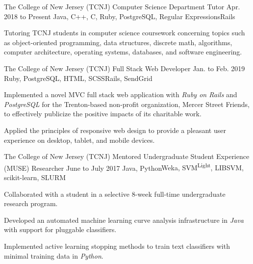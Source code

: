 
\begin{cventry}
    {The College of New Jersey (TCNJ)}
    {Computer Science Department Tutor}
    {Apr. 2018 to Present}
    {Java, C++, C, Ruby, PostgreSQL, Regular Expressions}{Rails}
    \begin{cvitems}
        \item Tutoring TCNJ students in computer science coursework concerning topics such as object-oriented programming, data structures, discrete math, algorithms, computer architecture, operating systems, databases, and software engineering.
    \end{cvitems}
\end{cventry}

\begin{cventry}
    {The College of New Jersey (TCNJ)}
    {Full Stack Web Developer}
    {Jan. to Feb. 2019}
    {Ruby, PostgreSQL, HTML, SCSS}{Rails, SendGrid}
    \begin{cvitems}
        \item Implemented a novel MVC full stack web application with \textsl{Ruby on Rails} and \textsl{PostgreSQL} for the Trenton-based non-profit organization, Mercer Street Friends, to effectively publicize the positive impacts of its charitable work.
        \item Applied the principles of responsive web design to provide a pleasant user experience on desktop, tablet, and mobile devices.
    \end{cvitems}
\end{cventry}

\begin{comment}
    \begin{cventry}
        {Varsity Tutors}
        {Java Tutor}
        {Sept. 2017 to May 2018}{}{}
        \begin{cvitems}
            \item Tutored AP Computer Science students regularly in an online one-on-one setting.
        \end{cvitems}
    \end{cventry}
\end{comment}

\begin{cventry}
    {The College of New Jersey (TCNJ)}
    {Mentored Undergraduate Student Experience (MUSE) Researcher}
    {June to July 2017}
    {Java, Python}{Weka, SVM\textsuperscript{Light}, LIBSVM, scikit-learn, SLURM}
    \begin{cvitems}
        \item Collaborated with a student in a selective 8-week full-time undergraduate research program.
        \item Developed an automated machine learning curve analysis infrastructure in \textsl{Java} with support for pluggable classifiers.
        \item Implemented active learning stopping methods to train text classifiers with minimal training data in \textsl{Python}.
    \end{cvitems}  
\end{cventry}

